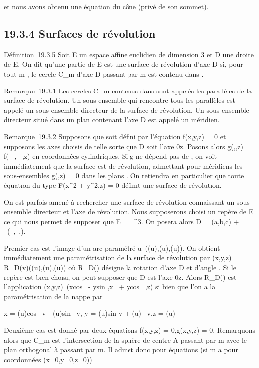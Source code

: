 \documentclass[]{article}
\begin{document}
et nous avons obtenu une équation du cône (privé de son sommet).

\subsection{19.3.4 Surfaces de révolution}

Définition~19.3.5 Soit E un espace affine euclidien de dimension 3 et D
une droite de E. On dit qu'une partie \Sigma de E est une surface de
révolution d'axe D si, pour tout m \in \Sigma, le cercle C_m d'axe D
passant par m est contenu dans \Sigma.

Remarque~19.3.1 Les cercles C_m contenus dans \Sigma sont appelés
les parallèles de la surface de révolution. Un sous-ensemble qui
rencontre tous les parallèles est appelé un sous-ensemble directeur de
la surface de révolution. Un sous-ensemble directeur situé dans un plan
contenant l'axe D est appelé un méridien.

Remarque~19.3.2 Supposons que \Sigma soit défini par l'équation f(x,y,z) = 0
et supposons les axes choisis de telle sorte que D soit l'axe 0z. Posons
alors g(\rho,\theta,z) = f(\rhocos~
\theta,\rhosin~ \theta,z) en coordonnées cylindriques. Si g
ne dépend pas de \theta, on voit immédiatement que la surface est de
révolution, admettant pour méridiens les sous-ensembles g(\rho,z) = 0 dans
les plans \rhoOz. On retiendra en particulier que toute équation du type
F(x^2 + y^2,z) = 0 définit une surface de
révolution.

On est parfois amené à rechercher une surface de révolution connaissant
un sous-ensemble directeur \Gamma et l'axe de révolution. Nous supposerons
choisi un repère de E ce qui nous permet de supposer que E =
~^3. On posera alors D = (a,b,c) + ~(\alpha~,\beta~,\gamma).

Premier cas \Gamma est l'image d'un arc paramétré
u\mapsto~(\phi(u),\psi(u),\omega(u)). On obtient immédiatement
une paramétrisation de la surface de révolution par (x,y,z) =
R_D(v)(\phi(u),\psi(u),\omega(u)) où R_D(\theta) désigne la rotation
d'axe D et d'angle \theta. Si le repère est bien choisi, on peut supposer que
D est l'axe 0z. Alors R_D(\theta) est l'application
(x,y,z)\mapsto~(xcos~ \theta -
ysin \theta,x\sin~ \theta +
ycos~ \theta,z) si bien que l'on a la
paramétrisation de la nappe par

x = \phi(u)cos~ v -
\psi(u)sin~ v, y =
\phi(u)sin v + \psi(u)\cos~
v,z = \omega(u)

Deuxième cas \Gamma est donné par deux équations f(x,y,z) = 0,g(x,y,z) = 0.
Remarquons alors que C_m est l'intersection de la sphère de
centre A passant par m avec le plan orthogonal à
\vecu passant par m. Il admet donc pour équations (si
m a pour coordonnées (x_0,y_0,z_0))
\end{document}
